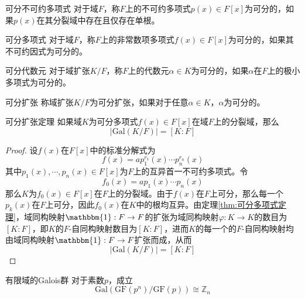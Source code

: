 \documentclass[lang = cn, scheme = chinese, thmcnt = section]{elegantbook}
\newcommand{\Z}{\mathbb{Z}}            %
\begin{document}
\begin{definition}{可分不可约多项式}
	对于域$F$，称$F$上的不可约多项式$p(x)\in F[x]$为可分的，如果$p(x)$在其分裂域中存在且仅存在单根。
\end{definition}

\begin{definition}{可分多项式}
	对于域$F$，称$F$上的非常数项多项式$f(x)\in F[x]$为可分的，如果其不可约因式为可分的。
\end{definition}

\begin{definition}{可分代数元}
	对于域扩张$K/F$，称$F$上的代数元$\alpha\in K$为可分的，如果$\alpha$在$F$上的极小多项式为可分的。
\end{definition}

\begin{definition}{可分扩张}
	称域扩张$K/F$为可分扩张，如果对于任意$\alpha\in K$，$\alpha$为可分的。
\end{definition}

\begin{theorem}{}{可分扩张定理}
	如果域$K$为可分多项式$f(x)\in F[x]$在域$F$上的分裂域，那么
	$$
	|\text{Gal}(K/F)|=[K:F]
	$$
\end{theorem}

\begin{proof}
	设$f(x)$在$F[x]$中的标准分解式为
	$$
	f(x)=ap_1^{r_1}(x)\cdots p_n^{r_n}(x)
	$$
	其中$p_1(x),\cdots,p_n(x)\in F[x]$为$F$上的互异首一不可约多项式。令
	$$
	f_0(x)=ap_1(x)\cdots p_n(x)
	$$
	那么$K$为$f_0(x)\in F[x]$在$F$上的分裂域。由于$f(x)$在$F$上可分，那么每一个$p_k(x)$在$F$上可分，因此$f_0(x)$在$K$中的根均互异。由定理\ref{thm:可分多项式定理}，域同构映射$\mathbbm{1}:F\to F$的扩张为域同构映射$\varphi:K\to K$的数目为$[K:F]$，即$K$的$F$-自同构映射数目为$[K:F]$，进而$K$的每一个的$F$-自同构映射均由域同构映射$\mathbbm{1}:F\to F$扩张而成，从而
	$$
	|\text{Gal}(K/F)|=[K:F]
	$$
\end{proof}

\begin{theorem}{有限域的Galois群}
	对于素数$p$，成立
	$$
	\text{Gal}(\text{GF}(p^n)/\text{GF}(p))\cong \Z_n
	$$
\end{theorem}
\end{document}
